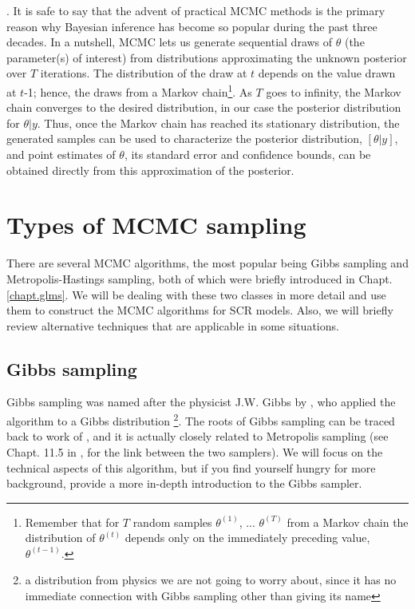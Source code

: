 \citep{gelfand_smith:1990}. It is safe to say that the advent of
practical MCMC methods is the primary reason why Bayesian inference
has become so popular during the past three decades.
In a nutshell, MCMC lets us generate sequential draws of $\theta$ (the
parameter(s) of interest) from distributions approximating the unknown
posterior over $T$ iterations. The distribution of the draw at $t$ depends
on the value drawn at $t$-1; hence, the draws from a Markov
chain\footnote{Remember that for
  $T$ random samples $\theta^ {(1)}$, ... $\theta^{(T)}$ from a Markov chain
  the distribution of $\theta^{(t)}$ depends only on the immediately preceding
  value, $\theta^{(t-1)}$.}. As $T$ goes to infinity, the Markov chain
converges to the desired distribution, in our case the posterior
distribution for $\theta|y$. Thus, once the Markov chain has reached
its stationary distribution, the generated samples can be used to
characterize the posterior distribution, $[\theta|y]$, and point
estimates of $\theta$, its standard error and confidence bounds, can
be obtained directly from this approximation of the posterior. 



\section{Types of MCMC sampling}

There are several MCMC algorithms, the most popular being Gibbs
sampling and Metropolis-Hastings sampling, both of which were briefly
introduced in Chapt. \ref{chapt.glms}. We will be dealing with these
two classes in more detail and use them to construct the MCMC
algorithms for SCR models. Also, we will briefly review alternative
techniques that are applicable in some situations.


\subsection{Gibbs sampling}
\label{mcmc.sec.gibbs}

Gibbs sampling was named after the physicist J.W. Gibbs by
\citet{geman_geman:1984}, who applied the algorithm to a Gibbs
distribution \footnote{a distribution from physics we are not going to
  worry about, since it has no immediate connection with Gibbs
  sampling other than giving its name}. The roots of Gibbs sampling
can be traced back to work of \citet{metropolis_ulam:1953}, and it is
actually closely related to Metropolis sampling (see Chapt. 11.5 in
\citet{gelman_etal:2004}, for the link between the two samplers). We
will focus on the technical aspects of this algorithm, but if you find
yourself hungry for more background, \citet{casella_george:1992}
provide a more in-depth introduction to the Gibbs sampler.

